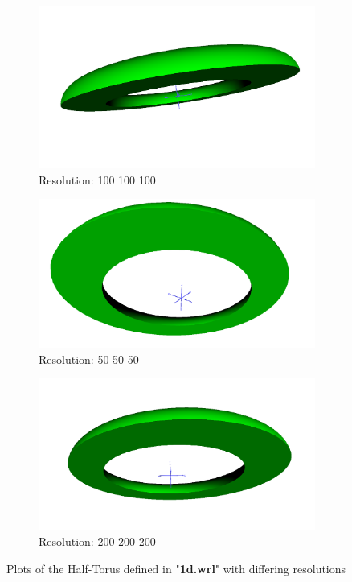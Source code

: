 \documentclass[acmlarge,nonacm=true]{acmart}
\begin{document}
\begin{figure}[H]
	\begin{subfigure}{.33\textwidth}
	  \centering
	  \includegraphics[width=.8\linewidth]{fig/1d100_100_100.PNG}
	  \caption{Resolution: 100 100 100}
	\end{subfigure}%
	\begin{subfigure}{.33\textwidth}
	  \centering
	  \includegraphics[width=.8\linewidth]{fig/1d50_50_50.PNG}
	  \caption{Resolution: 50 50 50}
	\end{subfigure}
	\begin{subfigure}{.33\textwidth}
		\centering
		\includegraphics[width=.8\linewidth]{fig/1d200_200_200.PNG}
		\caption{Resolution: 200 200 200}
	  \end{subfigure}
	\caption{Plots of the Half-Torus defined in "\textbf{1d.wrl}" with differing resolutions}
	\label{fig:1d}
\end{figure}
\end{document}

